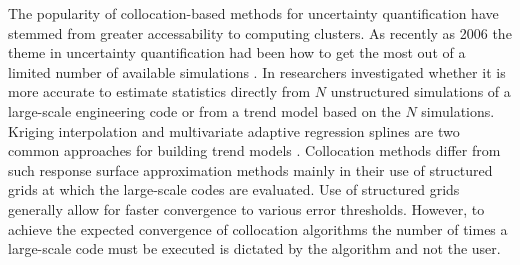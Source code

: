 The popularity of collocation-based methods for uncertainty quantification have stemmed from greater accessability to computing clusters. As recently as 2006 the theme in uncertainty quantification had been how to get the most out of a limited number of available simulations \cite{Giunta}. In \cite{Giunta} researchers investigated whether it is more accurate to estimate statistics directly from $N$ unstructured simulations of a large-scale engineering code or from a trend model based on the $N$ simulations. Kriging interpolation and multivariate adaptive regression splines are two common approaches for building trend models \cite{Swiler}. Collocation methods differ from such response surface approximation methods mainly in their use of structured grids at which the large-scale codes are evaluated. Use of structured grids generally allow for faster convergence to various error thresholds. However, to achieve the expected convergence of collocation algorithms the number of times a large-scale code must be executed is dictated by the algorithm and not the user.  
